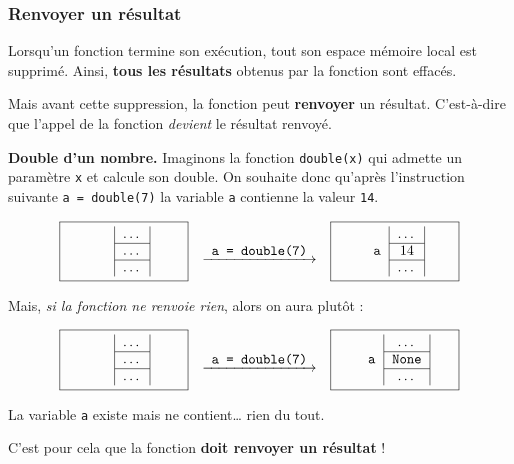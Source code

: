 \documentclass[a4paper,17pt]{extarticle}
\begin{document}
    \hypertarget{renvoyer-un-ruxe9sultat}{%
\subsubsection{Renvoyer un résultat}\label{renvoyer-un-ruxe9sultat}}

    Lorsqu'un fonction termine son exécution, tout son espace mémoire local
est supprimé. Ainsi, \textbf{tous les résultats} obtenus par la fonction
sont effacés.

Mais avant cette suppression, la fonction peut \textbf{renvoyer} un
résultat. C'est-à-dire que l'appel de la fonction \emph{devient} le
résultat renvoyé.
\begin{exemple}
    \textbf{Double d'un nombre.} Imaginons la fonction \texttt{double(x)}
qui admette un paramètre \texttt{x} et calcule son double. On souhaite
donc qu'après l'instruction suivante \texttt{a\ =\ double(7)} la
variable \texttt{a} contienne la valeur \texttt{14}.

\[
\fbox{\parbox{3cm}{\centering
    \begin{tabular}{r|c|}
    & \ldots \\ \cline{2-2}
    & \ldots \\ \cline{2-2}
    & \ldots 
    \end{tabular}
}}
\hfill
\quad\underrightarrow{~~\texttt{a = double(7)}~~}\quad
\hfill
\fbox{\parbox{3cm}{\centering
    \begin{tabular}{r|c|}
    & \ldots \\ \cline{2-2}
    \texttt{a} & $14$ \\ \cline{2-2}
    & \ldots 
    \end{tabular}
}}
\]

Mais, \emph{si la fonction ne renvoie rien}, alors on aura plutôt :

\[
\fbox{\parbox{3cm}{\centering
    \begin{tabular}{r|c|}
    & \ldots \\ \cline{2-2}
    & \ldots \\ \cline{2-2}
    & \ldots 
    \end{tabular}
}}
\hfill
\quad\underrightarrow{~~\texttt{a = double(7)}~~}\quad
\hfill
\fbox{\parbox{3cm}{\centering
    \begin{tabular}{r|c|}
    & \ldots \\ \cline{2-2}
    \texttt{a} & \texttt{None} \\ \cline{2-2}
    & \ldots 
    \end{tabular}
}}
\]

La variable \texttt{a} existe mais ne contient\ldots{} rien du tout.

C'est pour cela que la fonction \textbf{doit renvoyer un résultat} !

        \end{exemple}
\end{document}
